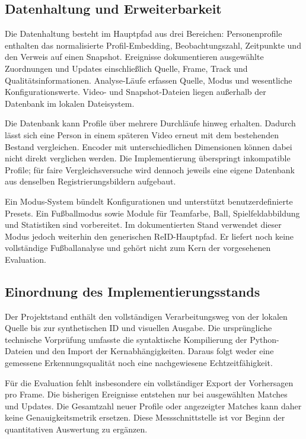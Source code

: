\documentclass[runningheads]{llncs}
\begin{document}
\subsection{Datenhaltung und Erweiterbarkeit}

Die Datenhaltung besteht im Hauptpfad aus drei Bereichen: Personenprofile enthalten das normalisierte Profil-Embedding, Beobachtungszahl, Zeitpunkte und den Verweis auf einen Snapshot. Ereignisse dokumentieren ausgewählte Zuordnungen und Updates einschlie{\ss}lich Quelle, Frame, Track und Qualitätsinformationen. Analyse-Läufe erfassen Quelle, Modus und wesentliche Konfigurationswerte. Video- und Snapshot-Dateien liegen au{\ss}erhalb der Datenbank im lokalen Dateisystem.

Die Datenbank kann Profile über mehrere Durchläufe hinweg erhalten. Dadurch lässt sich eine Person in einem späteren Video erneut mit dem bestehenden Bestand vergleichen. Encoder mit unterschiedlichen Dimensionen können dabei nicht direkt verglichen werden. Die Implementierung überspringt inkompatible Profile; für faire Vergleichsversuche wird dennoch jeweils eine eigene Datenbank aus denselben Registrierungsbildern aufgebaut.

Ein Modus-System bündelt Konfigurationen und unterstützt benutzerdefinierte Presets. Ein Fu{\ss}ballmodus sowie Module für Teamfarbe, Ball, Spielfeldabbildung und Statistiken sind vorbereitet. Im dokumentierten Stand verwendet dieser Modus jedoch weiterhin den generischen ReID-Hauptpfad. Er liefert noch keine vollständige Fu{\ss}ballanalyse und gehört nicht zum Kern der vorgesehenen Evaluation.

\subsection{Einordnung des Implementierungsstands}

Der Projektstand enthält den vollständigen Verarbeitungsweg von der lokalen Quelle bis zur synthetischen ID und visuellen Ausgabe. Die ursprüngliche technische Vorprüfung umfasste die syntaktische Kompilierung der Python-Dateien und den Import der Kernabhängigkeiten. Daraus folgt weder eine gemessene Erkennungsqualität noch eine nachgewiesene Echtzeitfähigkeit.

Für die Evaluation fehlt insbesondere ein vollständiger Export der Vorhersagen pro Frame. Die bisherigen Ereignisse entstehen nur bei ausgewählten Matches und Updates. Die Gesamtzahl neuer Profile oder angezeigter Matches kann daher keine Genauigkeitsmetrik ersetzen. Diese Messschnittstelle ist vor Beginn der quantitativen Auswertung zu ergänzen.
\end{document}
